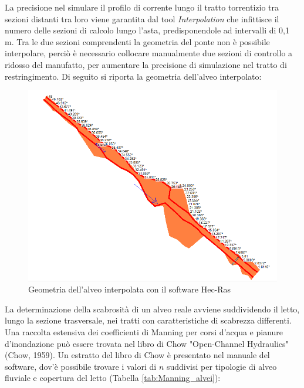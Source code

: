 \documentclass[12pt]{article} %
\begin{document}
%        

\noindent La precisione nel simulare il profilo di corrente lungo il tratto torrentizio tra sezioni distanti tra loro viene garantita dal tool \textit{Interpolation} che infittisce il numero delle sezioni di calcolo lungo l'asta, predisponendole ad intervalli di 0,1 m. Tra le due sezioni comprendenti la geometria del ponte non è possibile interpolare, perciò è necessario collocare manualmente due sezioni di controllo a ridosso del manufatto, per aumentare la precisione di simulazione nel tratto di restringimento.
Di seguito si riporta la geometria dell'alveo interpolato:

\begin{figure}[H]
    \centering
    \includegraphics[scale=0.69]{GeometriaSturla.PNG}
    \caption{Geometria dell'alveo interpolata con il software Hec-Ras}
\end{figure}

\noindent La determinazione della scabrosità di un alveo reale avviene suddividendo il letto, lungo la sezione trasversale, nei tratti con caratteristiche di scabrezza differenti. Una raccolta estensiva dei coefficienti di Manning per corsi d'acqua e pianure d'inondazione può essere trovata nel libro di Chow "Open-Channel Hydraulics" (Chow, 1959). Un estratto del libro di Chow è presentato nel manuale del software, dov'è possibile trovare i valori di $n$ suddivisi per tipologie di alveo fluviale e copertura del letto (Tabella \ref{tab:Manning_alvei}):
\end{document}
